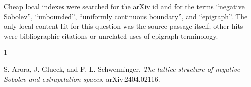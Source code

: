 \documentclass[11pt]{amsart}
\begin{document}
Cheap local indexes were searched for the arXiv id and for the terms
``negative Sobolev'', ``unbounded'', ``uniformly continuous boundary'', and
``epigraph''.  The only local content hit for this question was the source
passage itself; other hits were bibliographic citations or unrelated uses of
epigraph terminology.

\begin{thebibliography}{1}

S. Arora, J. Glueck, and F. L. Schwenninger,
\emph{The lattice structure of negative Sobolev and extrapolation spaces},
arXiv:2404.02116.

\end{thebibliography}
\end{document}
